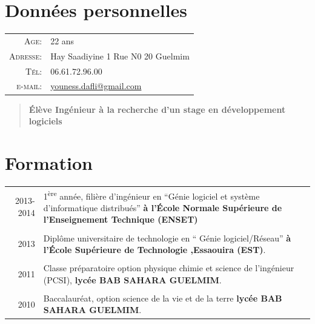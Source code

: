 \documentclass[a4paper,10pt]{article} %
\begin{document}
\section{Données personnelles}

\begin{tabular}{rl}
\textsc{Age:} & 22 ans \\
\textsc{Adresse:} & Hay Saadiyine 1 Rue N0 20 Guelmim  \\
\textsc{Tél:} & 06.61.72.96.00\\
\textsc{e-mail:} & \href{mailto:youness.dafli@gmail.com}{youness.dafli@gmail.com}
\end{tabular}


\vspace{15pt}
\begin{quotation}
\textbf{Élève Ingénieur à la recherche d'un stage en développement logiciels}
\end{quotation}
\vspace{5pt}
              

\section{Formation}

\begin{tabular}{r|p{11cm}}	
\textsc {2013-2014} & 
1\textsuperscript{ère} année, filière d'ingénieur en ``Génie logiciel et système d'informatique distribués''
\textbf{à l'École Normale Supérieure de l'Enseignement Technique (ENSET)}\\ \multicolumn{2}{c}{} \\


\textsc{2013} & Diplôme universitaire de technologie en `` Génie logiciel/Réseau'' \textbf{à l'École  Supérieure de Technologie ,Essaouira (EST)}.\\ \multicolumn{2}{c}{} \\


\textsc{2011} & Classe préparatoire option physique chimie et science de l'ingénieur (PCSI),
\textbf{lycée BAB SAHARA GUELMIM}.\\ \multicolumn{2}{c}{} \\


\textsc{2010} &  Baccalauréat, option science de la vie et de la terre \textbf{lycée BAB SAHARA GUELMIM}.
\end{tabular}
\end{document}
